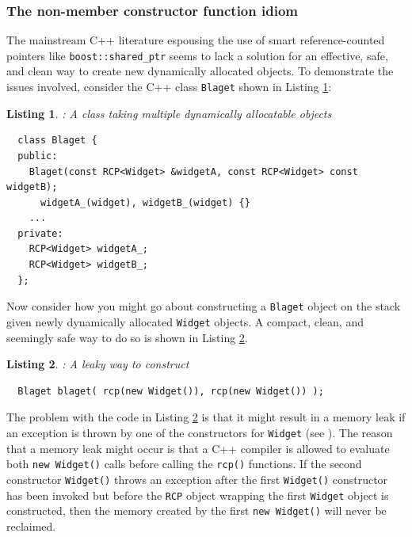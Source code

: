 \documentclass[pdf,ps2pdf,11pt]{SANDreport}
\newtheorem{listing}{Listing}
\begin{document}
%
{}\subsubsection{The non-member constructor function idiom}
\label{sec:nonmember-constructor-idiom}
%

The mainstream C++ literature espousing the use of smart
reference-counted pointers like {}\texttt{boost::shared\_ptr} seems to
lack a solution for an effective, safe, and clean way to create new
dynamically allocated objects.  To demonstrate the issues involved,
consider the C++ class {}\texttt{Blaget} shown in Listing
{}\ref{listing:BlagetClass}:

\begin{listing}: A class taking multiple dynamically allocatable objects \\
\label{listing:BlagetClass}
{\small\begin{verbatim}
  class Blaget {
  public:
    Blaget(const RCP<Widget> &widgetA, const RCP<Widget> const widgetB);
      widgetA_(widget), widgetB_(widget) {}
    ...
  private:
    RCP<Widget> widgetA_;
    RCP<Widget> widgetB_;
  };
\end{verbatim}}
\end{listing}

Now consider how you might go about constructing a {}\texttt{Blaget}
object on the stack given newly dynamically allocated
{}\texttt{Widget} objects.  A compact, clean, and seemingly safe way
to do so is shown in Listing {}\ref{listing:BlagetConstruct1}.

\begin{listing}: A leaky way to construct \\
\label{listing:BlagetConstruct1}
{\small\begin{verbatim}
  Blaget blaget( rcp(new Widget()), rcp(new Widget()) );
\end{verbatim}}
\end{listing}

The problem with the code in Listing {}\ref{listing:BlagetConstruct1}
is that it might result in a memory leak if an exception is thrown by
one of the constructors for {}\texttt{Widget} (see {}\cite[Item
13]{C++CodingStandards05}).  The reason that a memory leak might occur
is that a C++ compiler is allowed to evaluate both {}\texttt{new
Widget()} calls before calling the {}\texttt{rcp()} functions.
If the second constructor {}\texttt{Widget()} throws an exception
after the first {}\texttt{Widget()} constructor has been invoked
but before the {}\texttt{RCP} object wrapping the first
{}\texttt{Widget} object is constructed, then the memory created by
the first {}\texttt{new Widget()} will never be reclaimed.
\end{document}
